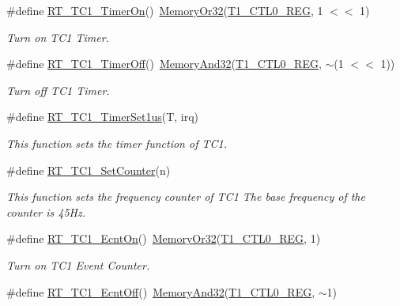 \begin{DoxyCompactItemize}
\#define \mbox{\hyperlink{a00044_ac76393581e0b1d58a9628139db72cdaf}{R\+T\+\_\+\+T\+C1\+\_\+\+Timer\+On}}()~\mbox{\hyperlink{a00020_a27874a97deab7cecdde5ddecf466e31e}{Memory\+Or32}}(\mbox{\hyperlink{a00020_a55600694c3c73a1019f78d306f474fa1}{T1\+\_\+\+C\+T\+L0\+\_\+\+R\+EG}}, 1 $<$$<$ 1)
\begin{DoxyCompactList}\small\item\em Turn on T\+C1 Timer. \end{DoxyCompactList}\item 
\#define \mbox{\hyperlink{a00044_a1bccbc833364c4f1c6ce63a758136817}{R\+T\+\_\+\+T\+C1\+\_\+\+Timer\+Off}}()~\mbox{\hyperlink{a00020_ad87cedffcaadc51db22594fce55173d4}{Memory\+And32}}(\mbox{\hyperlink{a00020_a55600694c3c73a1019f78d306f474fa1}{T1\+\_\+\+C\+T\+L0\+\_\+\+R\+EG}}, $\sim$(1 $<$$<$ 1))
\begin{DoxyCompactList}\small\item\em Turn off T\+C1 Timer. \end{DoxyCompactList}\item 
\#define \mbox{\hyperlink{a00044_a69c07e4e9fc56ae94d167f79399e7867}{R\+T\+\_\+\+T\+C1\+\_\+\+Timer\+Set1us}}(T,  irq)
\begin{DoxyCompactList}\small\item\em This function sets the timer function of T\+C1. \end{DoxyCompactList}\item 
\#define \mbox{\hyperlink{a00044_ac04f2d9427689062596382399aa7d909}{R\+T\+\_\+\+T\+C1\+\_\+\+Set\+Counter}}(n)
\begin{DoxyCompactList}\small\item\em This function sets the frequency counter of T\+C1 The base frequency of the counter is 45\+Hz. \end{DoxyCompactList}\item 
\#define \mbox{\hyperlink{a00044_add9b6f778a744d79226f5165a04a38d9}{R\+T\+\_\+\+T\+C1\+\_\+\+Ecnt\+On}}()~\mbox{\hyperlink{a00020_a27874a97deab7cecdde5ddecf466e31e}{Memory\+Or32}}(\mbox{\hyperlink{a00020_a55600694c3c73a1019f78d306f474fa1}{T1\+\_\+\+C\+T\+L0\+\_\+\+R\+EG}}, 1)
\begin{DoxyCompactList}\small\item\em Turn on T\+C1 Event Counter. \end{DoxyCompactList}\item 
\#define \mbox{\hyperlink{a00044_a1c9b9839a03d3e9b1158a2be2feebf42}{R\+T\+\_\+\+T\+C1\+\_\+\+Ecnt\+Off}}()~\mbox{\hyperlink{a00020_ad87cedffcaadc51db22594fce55173d4}{Memory\+And32}}(\mbox{\hyperlink{a00020_a55600694c3c73a1019f78d306f474fa1}{T1\+\_\+\+C\+T\+L0\+\_\+\+R\+EG}}, $\sim$1)

\end{DoxyCompactItemize}
